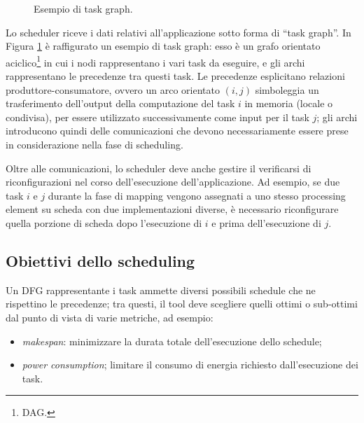 \begin{figure}[ht]
\begin{center}
\caption{Esempio di task graph.}
\label{fig:taskGraphExample}
\end{center}
\end{figure}

Lo scheduler riceve i dati relativi all'applicazione sotto forma di ``task graph''.
In Figura \ref{fig:taskGraphExample} è raffigurato un esempio di task graph: esso è un 
grafo orientato aciclico\footnote{\ac{DAG}.} in cui i nodi rappresentano i vari task da 
eseguire, e gli archi rappresentano le precedenze tra questi task.
Le precedenze esplicitano relazioni produttore-consumatore, ovvero un arco orientato 
$(i,j)$ simboleggia un trasferimento dell'output della computazione del task $i$ in 
memoria (locale o condivisa), per essere utilizzato successivamente come input per il 
task $j$; gli archi introducono quindi delle comunicazioni che devono necessariamente 
essere prese in considerazione nella fase di scheduling.

Oltre alle comunicazioni, lo scheduler deve anche gestire il verificarsi di 
riconfigurazioni nel corso dell'esecuzione dell'applicazione. Ad esempio, se due task $i$ 
e $j$ durante la fase di mapping vengono assegnati a uno stesso processing element su 
scheda con due implementazioni diverse, è necessario riconfigurare quella porzione di 
scheda dopo l'esecuzione di $i$ e prima dell'esecuzione di $j$.

\subsection{Obiettivi dello scheduling}
Un \ac{DFG} rappresentante i task ammette diversi possibili schedule che ne rispettino le 
precedenze; tra questi, il tool deve scegliere quelli ottimi o sub-ottimi dal punto di 
vista di varie metriche, ad esempio:
\begin{itemize}
 \item \emph{makespan}: minimizzare la durata totale dell'esecuzione dello schedule;
 \item \emph{power consumption}; limitare il consumo di energia richiesto 
dall'esecuzione dei task.
\end{itemize}


